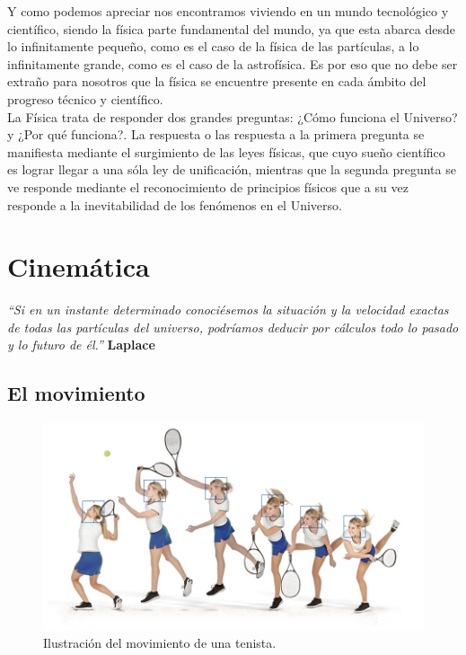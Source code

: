 \documentclass[a5paper,pagesize,10pt,bibtotoc,pointlessnumbers,
normalheadings,DIV=9,fleqn,x11names,table,twoside=false]{scrbook}
\begin{document}
Y como podemos apreciar nos encontramos viviendo en un mundo tecnológico y científico, siendo la física parte fundamental del 
mundo, ya que esta abarca desde lo infinitamente pequeño, como es el caso de la física de las partículas, a lo infinitamente 
grande, como es el caso de la astrofísica. Es por eso que no debe ser extraño para nosotros que la física se encuentre presente en 
cada ámbito del progreso técnico y científico.\\

La Física trata de responder dos grandes preguntas: ¿Cómo funciona el Universo? y ¿Por qué funciona?. La respuesta o las respuesta 
a la primera pregunta se manifiesta mediante el surgimiento de las leyes físicas, que cuyo sueño científico es lograr llegar a una 
sóla ley de unificación, mientras que la segunda pregunta se ve responde mediante el reconocimiento de principios físicos que a su 
vez responde a la inevitabilidad de los fenómenos en el Universo.

\chapter{Cinemática}

\textit{``Si en un instante determinado conociésemos la situación y la velocidad exactas de todas las partículas del universo, 
podríamos deducir por cálculos todo lo pasado y lo futuro de él.''}  \textbf{Laplace}

\section{El movimiento}

\begin{figure}[ht]
 \centering
 \includegraphics[scale=0.3]{images/movimiento.jpg}
 \caption{Ilustración del movimiento de una tenista.}
 \label{fig:vectorial}
\end{figure}
\end{document}
